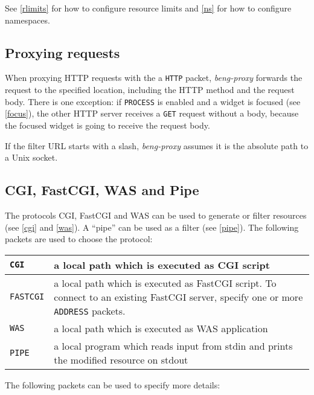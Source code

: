 \documentclass[a4paper,12pt]{article}
\begin{document}
See \ref{rlimits} for how to configure resource limits and \ref{ns}
for how to configure namespaces.

\subsection{Proxying requests}

When proxying HTTP requests with the a \verb|HTTP| packet,
\emph{beng-proxy} forwards the request to the specified location,
including the HTTP method and the request body.  There is one
exception: if \verb|PROCESS| is enabled and a widget is focused (see
\ref{focus}), the
other HTTP server receives a \verb|GET| request without a body,
because the focused widget is going to receive the request body.

If the filter URL starts with a slash, \emph{beng-proxy} assumes it is
the absolute path to a Unix socket.

\subsection{CGI, FastCGI, WAS and Pipe}
\label{t-cgi}

The protocols CGI, FastCGI and WAS can be used to generate or filter
resources (see \ref{cgi} and \ref{was}).  A ``pipe'' can be used as a
filter (see \ref{pipe}).  The following packets are used to choose the
protocol:

\begin{longtable}{|l|p{10cm}|}
\hline

\verb|CGI| & a local path which is executed as CGI script \\

\hline

\verb|FASTCGI| & a local path which is executed as FastCGI script.
To connect to an existing FastCGI server, specify one or more
\verb|ADDRESS| packets. \\

\hline

\verb|WAS| & a local path which is executed as WAS application \\

\hline

\verb|PIPE| & a local program which reads input from stdin and
prints the modified resource on stdout \\

\hline
\end{longtable}

The following packets can be used to specify more details:
\end{document}
